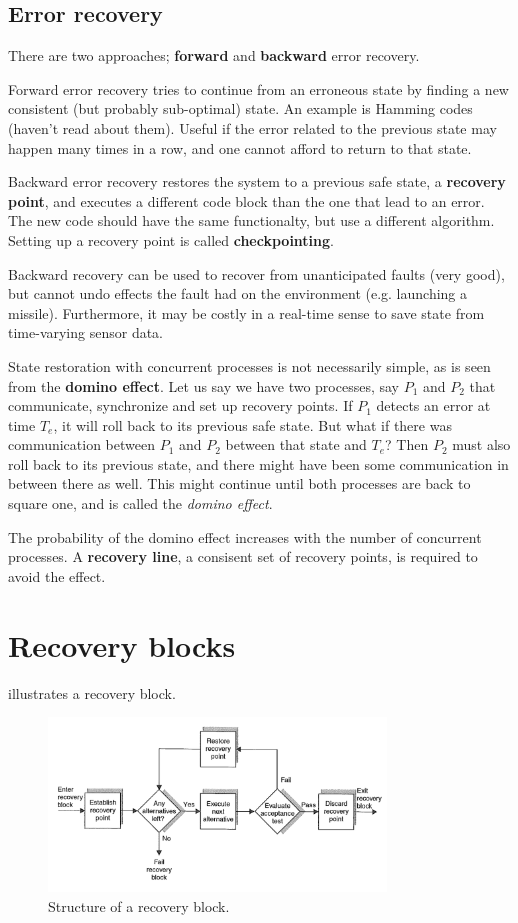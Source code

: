 \subsection{Error recovery}
There are two approaches; \textbf{forward} and \textbf{backward} error recovery.

Forward error recovery tries to continue from an erroneous state by finding a new consistent (but probably sub-optimal) state.  An example is Hamming codes (haven't read about them). Useful if the error related to the previous state may happen many times in a row, and one cannot afford to return to that state.

Backward error recovery restores the system to a previous safe state, a \textbf{recovery point}, and executes a different code block than the one that lead to an error. The new code should have the same functionalty, but use a different algorithm. Setting up a recovery point is called \textbf{checkpointing}.

Backward recovery can be used to recover from unanticipated faults (very good), but cannot undo effects the fault had on the environment (e.g. launching a missile). Furthermore, it may be costly in a real-time sense to save state from time-varying sensor data.

State restoration with concurrent processes is not necessarily simple, as is seen from the \textbf{domino effect}. Let us say we have two processes, say $P_1$ and $P_2$ that communicate, synchronize and set up recovery points. If $P_1$ detects an error at time $T_e$, it will roll back to its previous safe state. But what if there was communication between $P_1$ and $P_2$ between that state and $T_e$? Then $P_2$ must also roll back to its previous state, and there might have been some communication in between there as well. This might continue until both processes are back to square one, and is called the \emph{domino effect}. 

The probability of the domino effect increases with the number of concurrent processes. A \textbf{recovery line}, a consisent set of recovery points, is required to avoid the effect.

\section{Recovery blocks}
 illustrates a recovery block.
\begin{figure}[]
    \centering
    \includegraphics[width=0.8\textwidth]{recovery_block.png}
    \caption{Structure of a recovery block.}
    \label{fig:recovery_block}
\end{figure}

